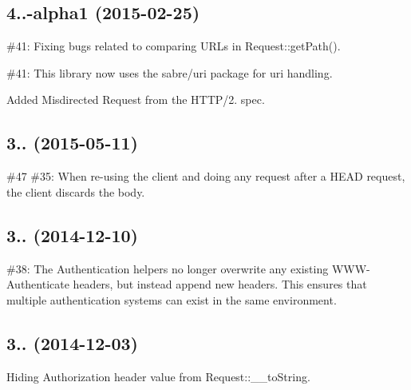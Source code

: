 \subsection*{4..-\/alpha1 (2015-\/02-\/25) }


\begin{DoxyItemize}
\item \#41\+: Fixing bugs related to comparing U\+R\+Ls in {\ttfamily Request\+::get\+Path()}.
\item \#41\+: This library now uses the {\ttfamily sabre/uri} package for uri handling.
\item Added { Misdirected Request} from the H\+T\+T\+P/2. spec.
\end{DoxyItemize}

\subsection*{3.. (2015-\/05-\/11) }


\begin{DoxyItemize}
\item \#47 \#35\+: When re-\/using the client and doing any request after a {\ttfamily H\+E\+AD} request, the client discards the body.
\end{DoxyItemize}

\subsection*{3.. (2014-\/12-\/10) }


\begin{DoxyItemize}
\item \#38\+: The Authentication helpers no longer overwrite any existing {\ttfamily W\+W\+W-\/\+Authenticate} headers, but instead append new headers. This ensures that multiple authentication systems can exist in the same environment.
\end{DoxyItemize}

\subsection*{3.. (2014-\/12-\/03) }


\begin{DoxyItemize}
\item Hiding {\ttfamily Authorization} header value from {\ttfamily Request\+::\+\_\+\+\_\+to\+String}.
\end{DoxyItemize}

